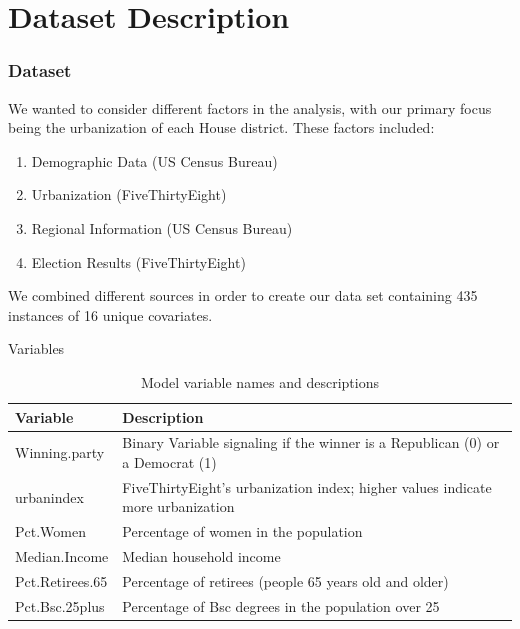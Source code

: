 \documentclass{beamer}
\begin{document}
\section{Dataset Description}
\begin{frame}
\frametitle{Dataset}
We wanted to consider different factors in the analysis, with our primary focus being the urbanization of each House district. These factors included: 
\begin{enumerate}
  \item Demographic Data (US Census Bureau)
  \item Urbanization (FiveThirtyEight)
  \item Regional Information (US Census Bureau)
  \item Election Results (FiveThirtyEight)
\end{enumerate}
We combined different sources in order to create our data set containing 435 instances of 16 unique covariates.
\end{frame}  



\begin{frame}{Variables}
    
    \begin{table}
        \centering
        \begin{tabular}{l p{}}
            \hline
            Variable & Description\\
            \hline 
            Winning.party & Binary Variable signaling if the winner is a Republican (0) or a Democrat (1) \\
            urbanindex & FiveThirtyEight’s urbanization index; higher values indicate more urbanization\\
            Pct.Women & Percentage of women in the population\\
            Median.Income & Median household income \\
            Pct.Retirees.65 & Percentage of retirees (people 65 years old and older)\\
            Pct.Bsc.25plus & Percentage of Bsc degrees in the population over 25 \\
            \hline
        \end{tabular}
        \caption{Model variable names and descriptions}
        \label{tab:my_label}
    \end{table}
\end{frame}
\end{document}
